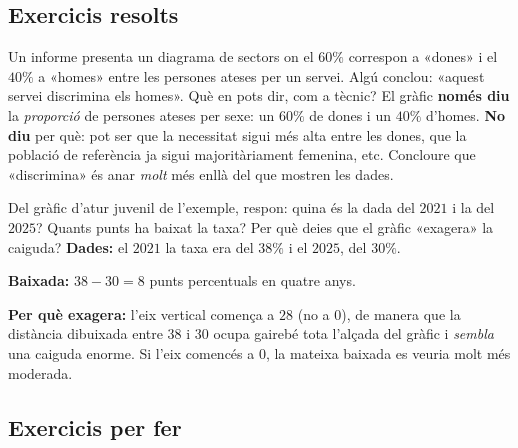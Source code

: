 \subsection{Exercicis resolts}

\begin{exresolt}
Un informe presenta un diagrama de sectors on el $60\%$ correspon a «dones» i el
$40\%$ a «homes» entre les persones ateses per un servei. Algú conclou: «aquest servei
discrimina els homes». Què en pots dir, com a tècnic?
\solucio
El gràfic \textbf{només diu} la \emph{proporció} de persones ateses per sexe: un
$60\%$ de dones i un $40\%$ d'homes. \textbf{No diu} per què: pot ser que la
necessitat sigui més alta entre les dones, que la població de referència ja sigui
majoritàriament femenina, etc. Concloure que «discrimina» és anar \emph{molt} més
enllà del que mostren les dades.
\end{exresolt}

\begin{exresolt}
Del gràfic d'atur juvenil de l'exemple, respon: quina és la dada del $2021$ i la del
$2025$? Quants punts ha baixat la taxa? Per què deies que el gràfic «exagera» la
caiguda?
\solucio
\textbf{Dades:} el $2021$ la taxa era del $38\%$ i el $2025$, del $30\%$.

\textbf{Baixada:} $38-30=8$ punts percentuals en quatre anys.

\textbf{Per què exagera:} l'eix vertical comença a $28$ (no a $0$), de manera que la
distància dibuixada entre $38$ i $30$ ocupa gairebé tota l'alçada del gràfic i
\emph{sembla} una caiguda enorme. Si l'eix comencés a $0$, la mateixa baixada es
veuria molt més moderada.
\end{exresolt}

\subsection{Exercicis per fer}

